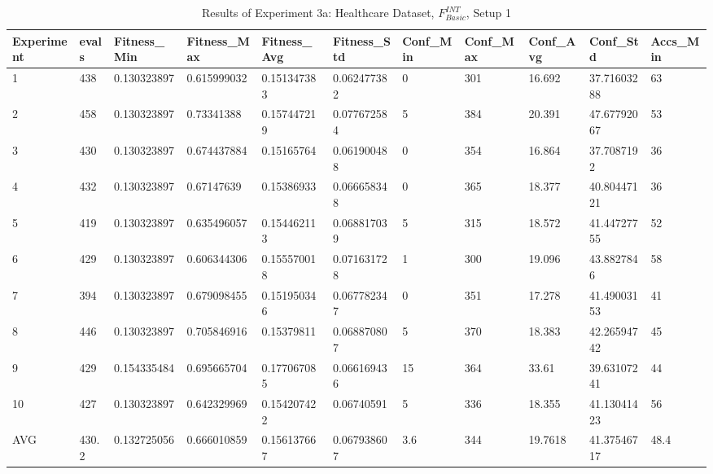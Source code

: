 		\begin{table}[H]
			\caption{Results of Experiment 3a: Healthcare Dataset, $F_{Basic}^{INT}$, Setup 1}
			\label{tab:A_Exp3a_Data}
			\begin{adjustbox}{max width=380pt,keepaspectratio,angle=90}
				\begin{tabular}{|l|l|l|l|l|l|l|l|l|l|l|}
					\rowcolor[HTML]{EFEFEF} 
					\hline
					Experiment & evals & Fitness\_Min & Fitness\_Max & Fitness\_Avg & Fitness\_Std & Conf\_Min & Conf\_Max & Conf\_Avg & Conf\_Std   & Accs\_Min \\ \hline
					1          & 438   & 0.130323897  & 0.615999032  & 0.151347383  & 0.062477382  & 0         & 301       & 16.692    & 37.71603288 & 63        \\ \hline
					2          & 458   & 0.130323897  & 0.73341388   & 0.157447219  & 0.077672584  & 5         & 384       & 20.391    & 47.67792067 & 53        \\ \hline
					3          & 430   & 0.130323897  & 0.674437884  & 0.15165764   & 0.061900488  & 0         & 354       & 16.864    & 37.7087192  & 36        \\ \hline
					4          & 432   & 0.130323897  & 0.67147639   & 0.15386933   & 0.066658348  & 0         & 365       & 18.377    & 40.80447121 & 36        \\ \hline
					5          & 419   & 0.130323897  & 0.635496057  & 0.154462113  & 0.068817039  & 5         & 315       & 18.572    & 41.44727755 & 52        \\ \hline
					6          & 429   & 0.130323897  & 0.606344306  & 0.155570018  & 0.071631728  & 1         & 300       & 19.096    & 43.8827846  & 58        \\ \hline
					7          & 394   & 0.130323897  & 0.679098455  & 0.151950346  & 0.067782347  & 0         & 351       & 17.278    & 41.49003153 & 41        \\ \hline
					8          & 446   & 0.130323897  & 0.705846916  & 0.15379811   & 0.068870807  & 5         & 370       & 18.383    & 42.26594742 & 45        \\ \hline
					9          & 429   & 0.154335484  & 0.695665704  & 0.177067085  & 0.066169436  & 15        & 364       & 33.61     & 39.63107241 & 44        \\ \hline
					10         & 427   & 0.130323897  & 0.642329969  & 0.154207422  & 0.06740591   & 5         & 336       & 18.355    & 41.13041423 & 56        \\ \hline\hline
					AVG        & 430.2 & 0.132725056  & 0.666010859  & 0.156137667  & 0.067938607  & 3.6       & 344       & 19.7618   & 41.37546717 & 48.4      \\ \hline

\end{tabular}
\end{adjustbox}
\end{table}
